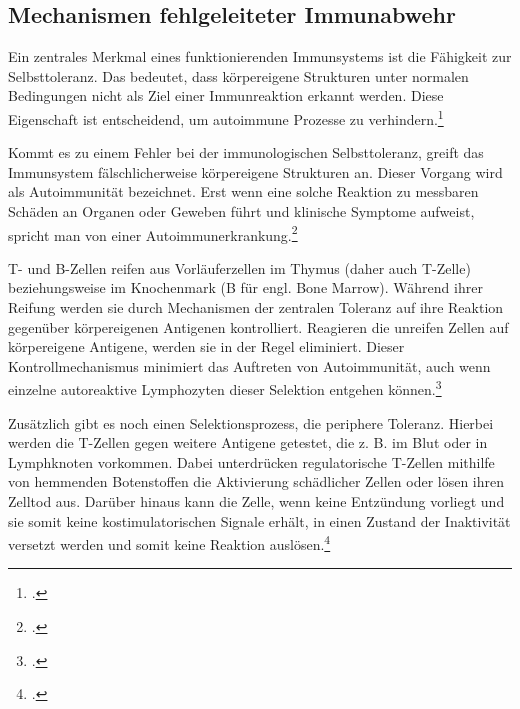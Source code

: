\subsection{Mechanismen fehlgeleiteter Immunabwehr}

Ein zentrales Merkmal eines funktionierenden Immunsystems ist die Fähigkeit zur Selbsttoleranz. Das bedeutet, dass körpereigene Strukturen unter normalen Bedingungen nicht als Ziel einer Immunreaktion erkannt werden. Diese Eigenschaft ist entscheidend, um autoimmune Prozesse zu verhindern.\footcite{Smith1999}

Kommt es zu einem Fehler bei der immunologischen Selbsttoleranz, greift das Immunsystem fälschlicherweise körpereigene Strukturen an. Dieser Vorgang wird als Autoimmunität bezeichnet. Erst wenn eine solche Reaktion zu messbaren Schäden an Organen oder Geweben führt und klinische Symptome aufweist, spricht man von einer Autoimmunerkrankung.\footcite{Fernandez2026}


T- und B-Zellen reifen aus Vorläuferzellen im Thymus (daher auch T-Zelle) beziehungsweise im Knochenmark (B für engl. Bone Marrow). Während ihrer Reifung werden sie durch Mechanismen der zentralen Toleranz auf ihre Reaktion gegenüber körpereigenen Antigenen kontrolliert. Reagieren die unreifen Zellen auf körpereigene Antigene, werden sie in der Regel eliminiert. Dieser Kontrollmechanismus minimiert das Auftreten von Autoimmunität, auch wenn einzelne autoreaktive Lymphozyten dieser Selektion entgehen können.\footcite{DocCheckImmuntoleranz, DocCheckLymphozyt}


Zusätzlich gibt es noch einen Selektionsprozess, die periphere Toleranz. Hierbei werden die T-Zellen gegen weitere Antigene getestet, die z. B. im Blut oder in Lymphknoten vorkommen. Dabei unterdrücken regulatorische T-Zellen mithilfe von hemmenden Botenstoffen die Aktivierung schädlicher Zellen oder lösen ihren Zelltod aus. Darüber hinaus kann die Zelle, wenn keine Entzündung vorliegt und sie somit keine kostimulatorischen Signale erhält, in einen Zustand der Inaktivität versetzt werden und somit keine Reaktion auslösen.\footcite{Macian2004, DocCheckImmuntoleranz}


